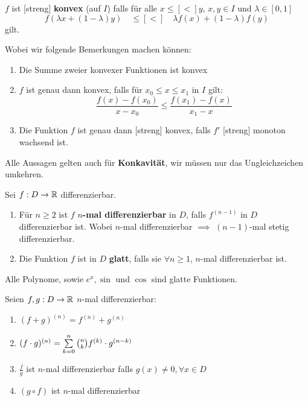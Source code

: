 \columnbreak



$f$ ist [streng] \textbf{konvex} (auf $I$) falls für alle $x \leq [<] y$, $x,y \in I$ und $\lambda \in [0,1]$
$$f(\lambda x + (1-\lambda)y) \quad \leq [<] \quad \lambda f(x) + (1-\lambda)f(y)$$
gilt.

Wobei wir folgende Bemerkungen machen können:
\begin{enumerate}[label = (\arabic*)]
    \item Die Summe zweier konvexer Funktionen ist konvex
    \item $f$ ist genau dann konvex, falls für $x_0 \leq x \leq x_1$ in $I$ gilt:
    $$\frac{f(x) - f(x_0)}{x - x_0} \leq \frac{f(x_1) - f(x)}{x_1 - x}$$
    \item Die Funktion $f$ ist genau dann [streng] konvex, falls $f'$ [streng] monoton wachsend ist.
\end{enumerate}

\Bem Alle Aussagen gelten auch für \textbf{Konkavität}, wir müssen nur das Ungleichzeichen umkehren.



Sei $f : D \to \mathbb{R}$ differenzierbar.
\begin{enumerate}[label = (\arabic*)]
    \item Für $n \geq 2$ ist $f$ \textbf{$n$-mal differenzierbar} in $D$, falls $f^{(n-1)}$ in $D$ 
    differenzierbar ist. Wobei $n$-mal differenzierbar $\implies$ $(n-1)$-mal stetig differenzierbar.
    \item Die Funktion $f$ ist in $D$ \textbf{glatt}, falls sie $\forall n \geq 1$, $n$-mal 
    differenzierbar ist.
\end{enumerate}

\Bem Alle Polynome, sowie $e^x, \sin$ und $\cos$ sind glatte Funktionen.



Seien $f,g : D \to \mathbb{R}$ $n$-mal differenzierbar:
\begin{enumerate}[label = (\arabic*)]
    \item $(f + g)^{(n)} = f^{(n)} + g^{(n)}$
    \item $(f \cdot g)^{(n)} = \sum\limits_{k = 0}^{n} \binom{n}{k} f^{(k)} \cdot g^{(n-k)}$
    \item $\frac{f}{g}$ ist $n$-mal differenzierbar falls $g(x) \neq 0, \forall x \in D$
    \item $(g \circ f)$ ist $n$-mal differenzierbar
\end{enumerate}


